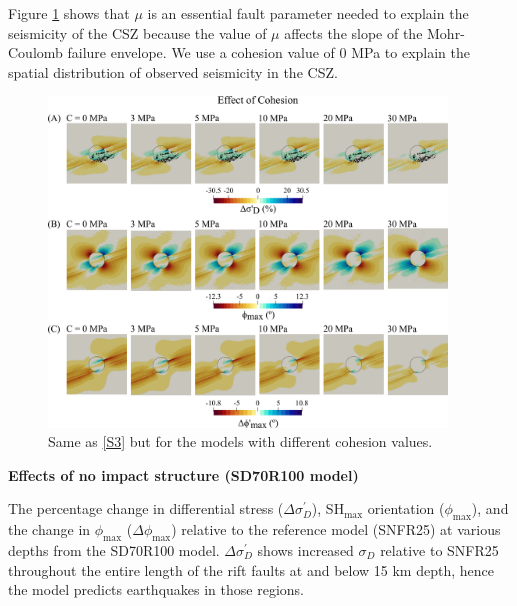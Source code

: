 \documentclass[draft,jgrga]{agutexSI2019}
\begin{document}
\begin{article}
Figure \ref{S4} shows that $\mu$ is an essential fault parameter needed to explain the seismicity of the CSZ because the value of $\mu$ affects the slope of the Mohr-Coulomb failure envelope. We use a cohesion value of 0 MPa to explain the spatial distribution of observed seismicity in the CSZ. 

\vspace{10mm} %

\begin{figure}[ht]
\includegraphics[width=25pc]{Figures/SD70R25C_S2.png}
\caption{Same as \ref{S3} but for the models with different cohesion values.}
\label{S4}
\end{figure}

\vspace{10mm} %

\noindent\textbf{Effects of no impact structure (SD70R100 model)}

The percentage change in differential stress ($\Delta\sigma_{D}^{\prime}$), SH$_{\max}$ orientation ($\phi_{\max}$), and the change in $\phi_{\max}$ ($\Delta\phi_{\max}$) relative to the reference model (SNFR25) at various depths from the SD70R100 model.  $\Delta\sigma_{D}^{\prime}$ shows increased $\sigma_{D}$ relative to SNFR25 throughout the entire length of the rift faults at and below 15 km depth, hence the model predicts earthquakes in those regions. 

\vspace{10mm} %


\end{article}
\end{document}

